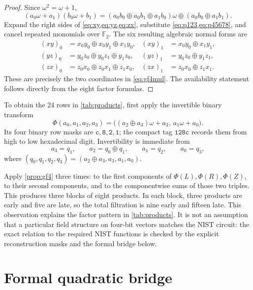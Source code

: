 \documentclass[11pt]{article}
\theoremstyle{definition}
\newcommand{\F}{\mathbb F}
\begin{document}
\begin{proof}
Since \(\omega^2=\omega+1\),
\begin{equation}
 (a_0\omega+a_1)(b_0\omega+b_1)
 =(a_0b_0\oplus a_0b_1\oplus a_1b_0)\omega
  \oplus(a_0b_0\oplus a_1b_1).
 \label{eq:gf4mul}
\end{equation}
Expand the right sides of \cref{eq:xy,eq:yz,eq:zx}, substitute
\cref{eq:p123,eq:p45678}, and cancel repeated monomials over \(\F_2\).  The six resulting algebraic
normal forms are
\begin{align*}
 (xy)_0&=x_0y_0\oplus x_0y_1\oplus x_1y_0,
 & (xy)_1&=x_0y_0\oplus x_1y_1,\\
 (yz)_0&=y_0z_0\oplus y_0z_1\oplus y_1z_0,
 & (yz)_1&=y_0z_0\oplus y_1z_1,\\
 (zx)_0&=z_0x_0\oplus z_0x_1\oplus z_1x_0,
 & (zx)_1&=z_0x_0\oplus z_1x_1.
\end{align*}
These are precisely the two coordinates in \cref{eq:gf4mul}.  The availability statement follows
directly from the eight factor formulas.
\end{proof}

To obtain the 24 rows in \cref{tab:products}, first apply the invertible binary transform
\begin{equation}
 \Phi(a_0,a_1,a_2,a_3)=
 \bigl((a_2\oplus a_3)\omega+a_3,\ a_1\omega+a_0\bigr).
 \label{eq:Phi}
\end{equation}
Its four binary row masks are \(\mathtt c,\mathtt8,\mathtt2,\mathtt1\); the compact tag
\(\mathtt{128c}\) records them from high to low hexadecimal digit.  Invertibility is immediate from
\[
 a_3=q_1,\qquad a_2=q_0\oplus q_1,\qquad a_1=q_2,\qquad a_0=q_3,
\]
where \((q_0,q_1,q_2,q_3)=(a_2\oplus a_3,a_3,a_1,a_0)\).

Apply \cref{prop:gf4} three times: to the first components of
\(\Phi(L),\Phi(R),\Phi(Z)\), to their second components, and to the componentwise sums of those two
triples.  This produces three blocks of eight products.  In each block, three products are early and
five are late, so the total filtration is nine early and fifteen late.  This observation explains the
factor pattern in \cref{tab:products}.  It is not an assumption that a particular field structure on
four-bit vectors matches the NIST circuit: the exact relation to the required NIST functions is
checked by the explicit reconstruction masks and the formal bridge below.

\section{Formal quadratic bridge}
\label{sec:formal}
\end{document}
